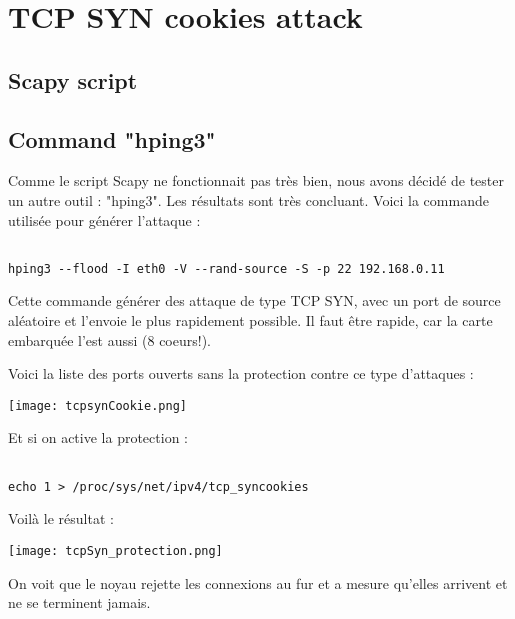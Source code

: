 \section{TCP SYN cookies attack}
\subsection{Scapy script}




\subsection{Command "hping3"}
Comme le script Scapy ne fonctionnait pas très bien, nous avons décidé de tester un autre outil : "hping3". Les résultats sont très concluant. Voici la commande utilisée pour générer l'attaque :
\begin{lstlisting}[frame=single,style=Console]  % Start your code-block

hping3 --flood -I eth0 -V --rand-source -S -p 22 192.168.0.11
\end{lstlisting}

Cette commande générer des attaque de type TCP SYN, avec un port de source aléatoire et l'envoie le plus rapidement possible. Il faut être rapide, car la carte embarquée l'est aussi (8 coeurs!).

Voici la liste des ports ouverts sans la protection contre ce type d'attaques :
\begin{center} 
\hspace{15cm}
\texttt{[image: tcpsynCookie.png]}
\end{center}
\vspace{0.5cm}

\pagebreak
Et si on active la protection : 
\begin{lstlisting}[frame=single,style=Console]  % Start your code-block

echo 1 > /proc/sys/net/ipv4/tcp_syncookies
\end{lstlisting}

Voilà le résultat :
\begin{center} 
\hspace{15cm}
\texttt{[image: tcpSyn\_protection.png]}
\end{center}
\vspace{0.5cm}

On voit que le noyau rejette les connexions au fur et a mesure qu'elles arrivent et ne se terminent jamais.


